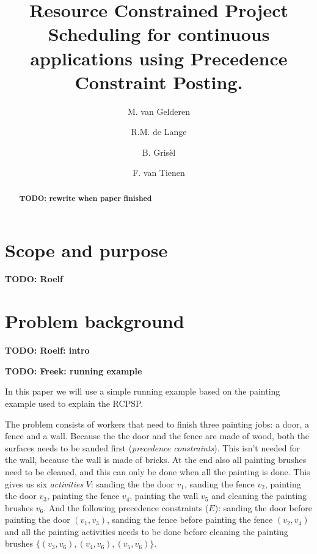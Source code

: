 \documentclass{article}
\title{Resource Constrained Project Scheduling for continuous applications using Precedence Constraint Posting.}
\author{M. van Gelderen  \and
    R.M. de Lange \and
    B. Gris\`el \and
    F. van Tienen}
\date{}
\newcommand{\TODO}[1]{{\color{red}\textbf{TODO: #1}}}
\begin{document}
\maketitle
\thispagestyle{empty}

\begin{abstract}
\TODO{rewrite when paper finished}
\end{abstract}


\newpage


\section{Scope and purpose}

\TODO{Roelf}


\newpage


\section{Problem background}

\TODO{Roelf: intro}

\TODO{Freek: running example}

In this paper we will use a simple running example based on the painting example used to explain the RCPSP.

The problem consists of workers that need to finish three painting jobs: a door, a fence and a wall.
Because the the door and the fence are made of wood, both the surfaces needs to be sanded first (\emph{precedence constraints}).
This isn't needed for the wall, because the wall is made of bricks.
At the end also all painting brushes need to be cleaned, and this can only be done when all the painting is done.
This gives us six \emph{activities} $V$: sanding the the door $v_1$, sanding the fence $v_2$,  painting the door $v_3$, painting the fence $v_4$, painting the wall $v_5$ and cleaning the painting brushes $v_6$. And the following precedence constraints ($E$): sanding the door before painting the door $(v_1, v_3)$, sanding the fence before painting the fence $(v_2, v_4)$ and all the painting activities needs to be done before cleaning the painting brushes $\{(v_3, v_6), (v_4, v_6), (v_5, v_6)\}$.
\end{document}
